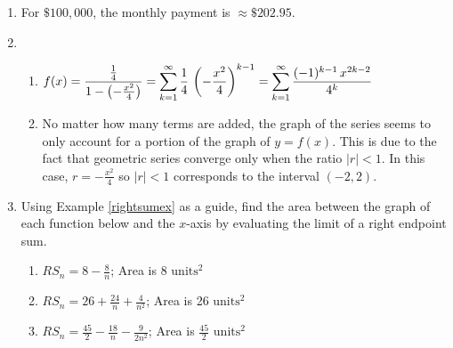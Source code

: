 \begin{enumerate}
\setcounter{enumi}{\value{HW}}

\item  For $\$100,\!000$, the monthly payment is $\approx \$202.95$.

\item  \begin{enumerate} \addtocounter{enumii}{1}  \item $f(x) = \dfrac{\frac{1}{4}}{1 - \left( -\frac{x^2}{4} \right)} = \displaystyle{\sum_{k=1}^{\infty} \frac{1}{4} \,\left( -\frac{x^2}{4} \right)^{k-1}} = \displaystyle{\sum_{k=1}^{\infty} \frac{(-1)^{k-1} \, x^{2k-2}}{4^{k}}} $
\item  No matter how many terms are added, the graph of the series seems to only account for a portion of the graph of $y = f(x)$.  This is due to the fact that geometric series converge only when the ratio $|r| < 1$.  In this case, $r =  -\frac{x^2}{4}$ so $|r| < 1$ corresponds to the interval $(-2,2)$.

\end{enumerate}

\item  Using Example \ref{rightsumex} as a guide, find the area between the graph of each function below and the $x$-axis by evaluating the limit of a right endpoint sum.



\begin{enumerate}

\item  $RS_{n} = 8 - \frac{8}{n}$;  Area is 8 $\text{units}^2$

\item    $RS_{n} = 26 + \frac{24}{n} + \frac{4}{n^2}$;  Area is 26 $\text{units}^2$

\item  $RS_{n} = \frac{45}{2}  - \frac{18}{n} - \frac{9}{2n^2}$;     Area is $\frac{45}{2}$  $\text{units}^2$


\end{enumerate}



\end{enumerate}

